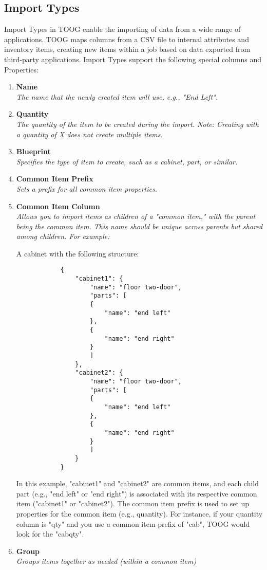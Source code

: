 \documentclass{memoir}
\begin{document}
	\subsection{Import Types}
	
	Import Types in TOOG enable the importing of data from a wide range of applications. TOOG maps columns from a CSV file to internal attributes and inventory items, creating new items within a job based on data exported from third-party applications. Import Types support the following special columns and Properties:
	
	\begin{enumerate}[]
		\item \textbf{Name}\\
		\textit{The name that the newly created item will use, e.g., "End Left".}
		
		\item \textbf{Quantity}\\
		\textit{The quantity of the item to be created during the import. Note: Creating with a quantity of X does not create multiple items.}
		
		\item \textbf{Blueprint}\\
		\textit{Specifies the type of item to create, such as a cabinet, part, or similar.}
		
		\item \textbf{Common Item Prefix}\\
		\textit{Sets a prefix for all common item properties.}
		
		\item \textbf{Common Item Column}\\
		\textit{Allows you to import items as children of a "common item," with the parent being the common item. This name should be unique across parents but shared among children. For example:}
		
		A cabinet with the following structure:
		
		\begin{verbatim}
			{
				"cabinet1": {
					"name": "floor two-door",
					"parts": [
					{
						"name": "end left"
					},
					{
						"name": "end right"
					}
					]
				},
				"cabinet2": {
					"name": "floor two-door",
					"parts": [
					{
						"name": "end left"
					},
					{
						"name": "end right"
					}
					]
				}
			}
		\end{verbatim}
		
		In this example, "cabinet1" and "cabinet2" are common items, and each child part (e.g., "end left" or "end right") is associated with its respective common item ("cabinet1" or "cabinet2"). The common item prefix is used to set up properties for the common item (e.g., quantity). For instance, if your quantity column is "qty" and you use a common item prefix of "cab", TOOG would look for the "cabqty".
		
		\item \textbf{Group}\\
		\textit{Groups items together as needed (within a common item)}
	\end{enumerate}
	
\end{document}
